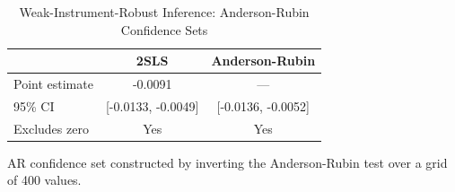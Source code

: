 \begin{table}[htbp]
\centering
\caption{Weak-Instrument-Robust Inference: Anderson-Rubin Confidence Sets}
\label{tab:ar}
\begin{tabular}{lcc}
\hline\hline
& 2SLS & Anderson-Rubin \\
\hline
Point estimate & -0.0091 & --- \\
95\% CI & [-0.0133, -0.0049] & [-0.0136, -0.0052] \\
Excludes zero & Yes & Yes \\
\hline\hline
\end{tabular}
\begin{tablenotes}\small
\item AR confidence set constructed by inverting the Anderson-Rubin test over a grid of 400 values.
\end{tablenotes}
\end{table}